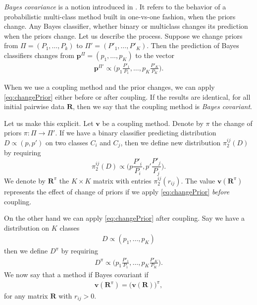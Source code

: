 \emph{Bayes covariance} is a notion introduced in  \cite{vsuch2016bayes}. It refers to the behavior of a probabilistic multi-class method built in one-vs-one fashion, when the priors change. Any Bayes classifier, whether binary or multiclass changes its prediction when the priors change. Let us describe the process. Suppose we change priors from $\Pi = (P_1, \ldots, P_k)$ to $\Pi'= (P'_1, \ldots, P'_K)$. Then the prediction of Bayes classifiers changes from $\boldsymbol{p}^\Pi= (p_1, \ldots, p_K)$ to the vector 
\begin{align}
\boldsymbol{p}^{\Pi'} \propto \biggl(p_1 \frac{P'_1}{P_1}, \ldots, p_K \frac{P'_K}{P_K}\biggr). \label{eq:changePrior}
\end{align}

When we use a coupling method and the prior changes, we  can apply \eqref{eq:changePrior} either before or after coupling. If the results are identical, for all initial pairwise data $\boldsymbol{R}$, then we say that the coupling method is \emph{Bayes covariant}. 

Let us make this explicit. Let $\boldsymbol{v}$ be a coupling method. Denote by  $\pi$ the change of priors $\pi:\Pi \rightarrow \Pi'$. If we have a  binary classifier predicting distribution $D \propto (p, p')$ on two classes $C_i$ and $C_j$, then we define new distribution $\pi_2^{ij}(D)$ by requiring
$$
\pi_2^{ij}(D) \propto \biggl(p \frac{P'_i}{P_i},p' \frac{P'_j}{P_j}\biggr).
$$
We denote by $\boldsymbol{R}^\pi$ the $K\times K$ matrix with entries $\pi_2^{ij}(r_{ij})$. The value $\boldsymbol{v}(\boldsymbol{R}^\pi)$ represents the effect of change of priors if we apply \eqref{eq:changePrior} \emph{before} coupling.

On the other hand we can apply \eqref{eq:changePrior} after coupling. Say we have a distribution on $K$ classes
\begin{align}
D \propto (p_1, \ldots, p_K)
\end{align}
then we define $D^\pi$ by requiring 
\begin{align}
D^\pi \propto \biggl(p_1 \frac{P'_1}{P_1}, \ldots, p_K \frac{P'_K}{P_K}\biggr). \label{def:prior:effect}
\end{align}
We now say that a method if Bayes covariant if
\begin{align}
\boldsymbol{v}(\boldsymbol{R}^\pi)=	\bigl(\boldsymbol{v}(\boldsymbol{R})\bigr)^\pi,
\end{align}
for any matrix $\boldsymbol{R}$ with $r_{ij}> 0$.




